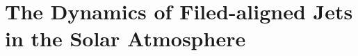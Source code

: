 \documentclass[12pt]{ociamthesis}
\newcommand{\solphys}{{\it Solar Phys.}}
\begin{document}
\baselineskip=18pt

\setcounter{secnumdepth}{3}
\setcounter{tocdepth}{3}

\setcounter{chapter}{1}


\chapter{The Dynamics of Filed-aligned Jets in the Solar Atmosphere}
\label{chap:sj}
%
\end{document}
